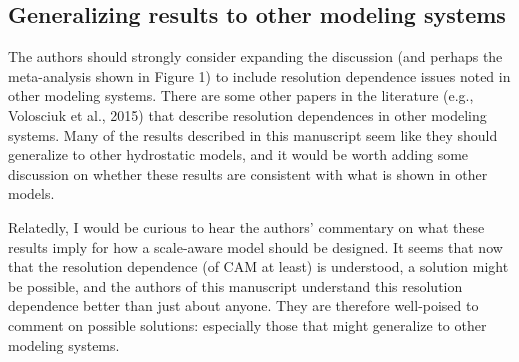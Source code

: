 \documentclass[12pt,oneside,a4paper]{article}%
\begin{document}
\subsection*{\small Generalizing results to other modeling systems}

The authors should strongly consider expanding the discussion (and perhaps the
meta-analysis shown in Figure 1) to include resolution dependence issues noted
in other modeling systems. There are some other papers in the literature (e.g.,
Volosciuk et al., 2015) that describe resolution dependences in other modeling
systems. Many of the results described in this manuscript seem like they should
generalize to other hydrostatic models, and it would be worth adding some
discussion on whether these results are consistent with what is shown in other
models. \newline

{\color{red}{See General Remarks.}} \newline

Relatedly, I would be curious to hear the authors’ commentary on what these
results imply for how a scale-aware model should be designed. It seems that
now that the resolution dependence (of CAM at least) is understood, a solution
might be possible, and the authors of this manuscript understand this resolution
dependence better than just about anyone. They are therefore well-poised to
comment on possible solutions: especially those that might generalize to other modeling systems. \newline

{} \newline
\end{document}
